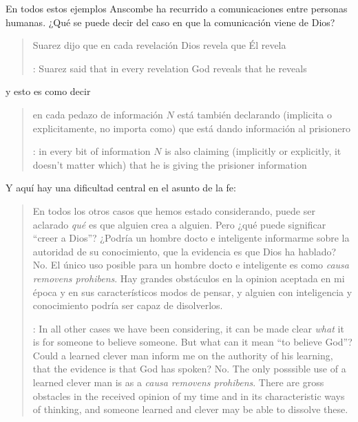 En todos estos ejemplos Anscombe ha recurrido a comunicaciones entre personas humanas. ¿Qué se puede decir del caso en que la comunicación viene de Dios? \blockquote[{\cite[118]{anscombe1981erp:faith}}: Suarez said that in every revelation God reveals that he reveals]{Suarez dijo que en cada revelación Dios revela que Él revela} y esto es como decir \blockquote[{\cite[118]{anscombe1981erp:faith}}: in every bit of information $N$ is also claiming (implicitly or explicitly, it doesn't matter which) that he is giving the prisioner information]{en cada pedazo de información $N$ está también declarando (implicita o explicitamente, no importa como) que está dando información al prisionero}. Y aquí hay una dificultad central en el asunto de la fe: \blockquote[{\cite[118]{anscombe1981erp:faith}}: In all other cases we have been considering, it can be made clear \emph{what} it is for someone to believe someone. But what can it mean ``to believe God''? Could a learned clever man inform me on the authority of his learning, that the evidence is that God has spoken? No. The only posssible use of a learned clever man is as a \emph{causa removens prohibens}. There are gross obstacles in the received opinion of my time and in its characteristic ways of thinking, and someone learned and clever may be able to dissolve these.]{En todos los otros casos que hemos estado considerando, puede ser aclarado \emph{qué} es que alguien crea a alguien. Pero ¿qué puede significar ``creer a Dios''? ¿Podría un hombre docto e inteligente informarme sobre la autoridad de su conocimiento, que la evidencia es que Dios ha hablado? No. El único uso posible para un hombre docto e inteligente es como \emph{causa removens prohibens}. Hay grandes obstáculos en la opinion aceptada en mi época y en sus característicos modos de pensar, y alguien con inteligencia y conocimiento podría ser capaz de disolverlos.}

